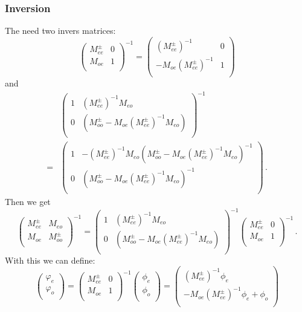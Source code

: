 \subsubsection{Inversion}

The need two invers matrices:
\[
\begin{pmatrix}
  M_{ee}^\pm & 0 \\
  M_{oe}   & 1 \\
\end{pmatrix}^{-1}
=
\begin{pmatrix}
      (M_{ee}^\pm)^{-1} & 0 \\
      -M_{oe} (M_{ee}^{\pm})^{-1}  & 1 \\
    \end{pmatrix}
\]
and 
\[
\begin{split}
  &\begin{pmatrix}
    1       & (M_{ee}^\pm)^{-1}M_{eo}\\
    0       & (M_{oo}^\pm-M_{oe}(M_{ee}^\pm)^{-1}M_{eo})\\
  \end{pmatrix}^{-1}
  \\=&
  \begin{pmatrix}
    1       & -(M_{ee}^\pm)^{-1}M_{eo}(M_{oo}^\pm-M_{oe}(M_{ee}^\pm)^{-1}M_{eo})^{-1}  \\
    0       & (M_{oo}^\pm-M_{oe}(M_{ee}^\pm)^{-1}M_{eo})^{-1}\\
  \end{pmatrix}\, .
\end{split}
\]
Then we get
\[
\begin{pmatrix}
  M_{ee}^\pm & M_{eo} \\
  M_{oe}    & M_{oo}^\pm \\
\end{pmatrix}^{-1}
=
\begin{pmatrix}
  1       & (M_{ee}^\pm)^{-1}M_{eo}\\
  0       & (M_{oo}^\pm-M_{oe}(M_{ee}^\pm)^{-1}M_{eo})\\
\end{pmatrix}^{-1}
\begin{pmatrix}
  M_{ee}^\pm & 0 \\
  M_{oe}   & 1 \\
\end{pmatrix}^{-1}\, .
\]
With this we can define:
\[
\begin{pmatrix}
  \varphi_e \\ \varphi_o\\
\end{pmatrix}
=
\begin{pmatrix}
  M_{ee}^\pm & 0 \\
  M_{oe}   & 1 \\
\end{pmatrix}^{-1}
\begin{pmatrix}
  \phi_e \\ \phi_o \\
\end{pmatrix}
=
\begin{pmatrix}
  (M_{ee}^\pm)^{-1} \phi_e \\ 
  -M_{oe}( M_{ee}^\pm)^{-1} \phi_e + \phi_o \\
\end{pmatrix}
\]
